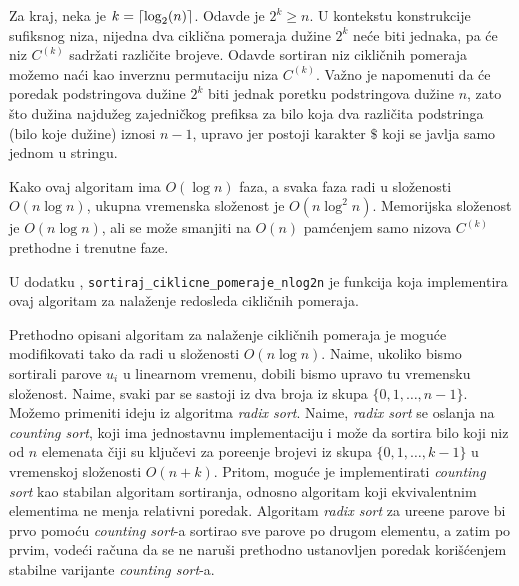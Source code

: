 Za kraj, neka je $k = \left \lceil \log_2(n) \right \rceil$. Odavde je $2^k \geq n$. U kontekstu konstrukcije sufiksnog niza, nijedna dva cikli\v cna pomeraja du\v zine $2^k$ ne\' ce biti jednaka, pa \' ce niz $C^{(k)}$ sadr\v zati razli\v cite brojeve. Odavde sortiran niz cikli\v cnih pomeraja mo\v zemo na\' ci kao inverznu permutaciju niza $C^{(k)}$. Va\v zno je napomenuti da \' ce poredak podstringova du\v zine $2^k$ biti jednak poretku podstringova du\v zine $n$, zato \v sto du\v zina najdu\v zeg zajedni\v ckog prefiksa za bilo koja dva razli\v cita podstringa (bilo koje du\v zine) iznosi $n-1$, upravo jer postoji karakter $\$$ koji se javlja samo jednom u stringu.

Kako ovaj algoritam ima $O(\log n)$ faza, a svaka faza radi u slo\v zenosti $O(n \log n)$, ukupna vremenska slo\v zenost je $O(n \log^2 n)$. Memorijska slo\v zenost je $O(n \log n)$, ali se mo\v ze smanjiti na $O(n)$ pam\' cenjem samo nizova $C^{(k)}$ prethodne i trenutne faze.

U dodatku \sirdodatak, \texttt{sortiraj\_ciklicne\_pomeraje\_nlog2n} je funkcija koja implementira ovaj algoritam za nala\v zenje redosleda cikli\v cnih pomeraja.


Prethodno opisani algoritam za nala\v zenje cikli\v cnih pomeraja je mogu\' ce modifikovati tako da radi u slo\v zenosti $O(n \log n)$. Naime, ukoliko bismo sortirali parove $u_i$ u linearnom vremenu, dobili bismo upravo tu vremensku slo\v zenost. Naime, svaki par se sastoji iz dva broja iz skupa $\{0, 1, \ldots, n-1\}$. Mo\v zemo primeniti ideju iz algoritma \textit{radix sort}. Naime, \textit{radix sort} se oslanja na \textit{counting sort}, koji ima jednostavnu implementaciju i mo\v ze da sortira bilo koji niz od $n$ elemenata \v ciji su klju\v cevi za pore\dj enje brojevi iz skupa $\{0, 1, \ldots, k-1\}$ u vremenskoj slo\v zenosti $O(n+k)$. Pritom, mogu\' ce je implementirati \textit{counting sort} kao stabilan algoritam sortiranja, odnosno algoritam koji ekvivalentnim elementima ne menja relativni poredak. Algoritam \textit{radix sort} za ure\dj ene parove bi prvo pomo\' cu \textit{counting sort}-a sortirao sve parove po drugom elementu, a zatim po prvim, vode\' ci ra\v cuna da se ne naru\v si prethodno ustanovljen poredak kori\v s\' cenjem stabilne varijante \textit{counting sort}-a.

